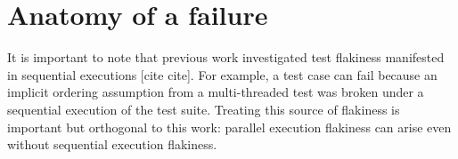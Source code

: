 \section{Anatomy of a \pef{} failure}


It is important to note that previous work investigated test flakiness
manifested in sequential executions [cite cite].  For example, a test
case can fail because an implicit ordering assumption from a
multi-threaded test was broken under a sequential execution of the
test suite.  Treating this source of flakiness is important but
orthogonal to this work: parallel execution flakiness can arise even
without sequential execution flakiness.


